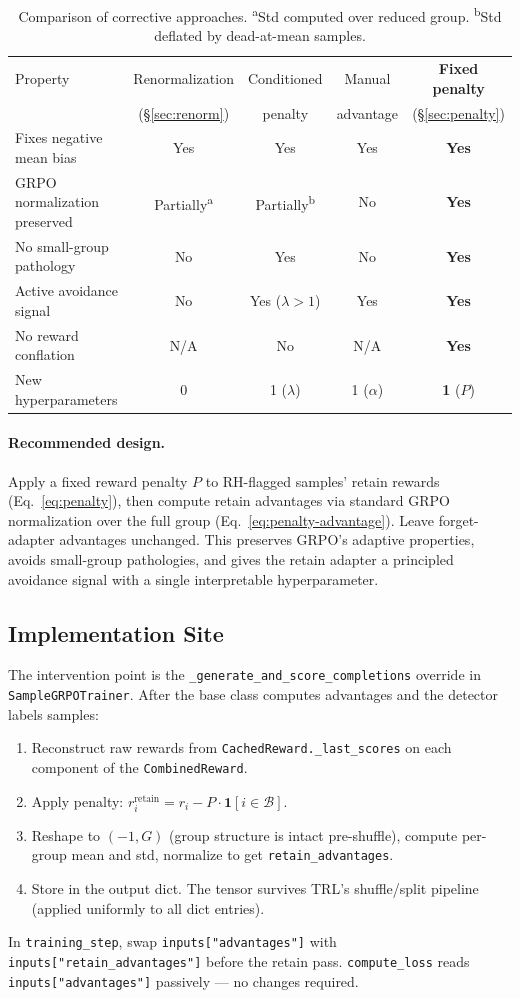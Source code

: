 \documentclass[11pt]{article}
\begin{document}
\begin{table}[h]
\centering
\small
\begin{tabular}{@{}lcccc@{}}
\toprule
Property & Renormalization & Conditioned & Manual & \textbf{Fixed penalty} \\
 & (\S\ref{sec:renorm}) & penalty & advantage & (\S\ref{sec:penalty}) \\
\midrule
Fixes negative mean bias    & Yes & Yes & Yes & \textbf{Yes} \\
GRPO normalization preserved & Partially\textsuperscript{a}
    & Partially\textsuperscript{b} & No & \textbf{Yes} \\
No small-group pathology     & No  & Yes & No  & \textbf{Yes} \\
Active avoidance signal      & No  & Yes ($\lambda > 1$) & Yes & \textbf{Yes} \\
No reward conflation         & N/A & No  & N/A & \textbf{Yes} \\
New hyperparameters          & 0   & 1 ($\lambda$) & 1 ($\alpha$) & \textbf{1} ($P$) \\
\bottomrule
\end{tabular}
\caption{Comparison of corrective approaches.
    \textsuperscript{a}Std computed over reduced group.
    \textsuperscript{b}Std deflated by dead-at-mean samples.}
\end{table}

\paragraph{Recommended design.}
Apply a fixed reward penalty $P$ to RH-flagged samples' retain rewards
(Eq.~\ref{eq:penalty}), then compute retain advantages via standard GRPO
normalization over the full group (Eq.~\ref{eq:penalty-advantage}). Leave
forget-adapter advantages unchanged. This preserves GRPO's adaptive properties,
avoids small-group pathologies, and gives the retain adapter a principled
avoidance signal with a single interpretable hyperparameter.

\subsection{Implementation Site}

The intervention point is the \texttt{\_generate\_and\_score\_completions}
override in \texttt{SampleGRPOTrainer}. After the base class computes
advantages and the detector labels samples:
\begin{enumerate}[nosep]
    \item Reconstruct raw rewards from \texttt{CachedReward.\_last\_scores}
        on each component of the \texttt{CombinedReward}.
    \item Apply penalty: $r_i^{\text{retain}} = r_i - P \cdot
        \mathbf{1}[i \in \mathcal{B}]$.
    \item Reshape to $(-1, G)$ (group structure is intact pre-shuffle),
        compute per-group mean and std, normalize to get
        \texttt{retain\_advantages}.
    \item Store in the output dict. The tensor survives TRL's shuffle/split
        pipeline (applied uniformly to all dict entries).
\end{enumerate}

In \texttt{training\_step}, swap \texttt{inputs["advantages"]} with
\texttt{inputs["retain\_advantages"]} before the retain pass.
\texttt{compute\_loss} reads \texttt{inputs["advantages"]} passively ---
no changes required.
\end{document}
